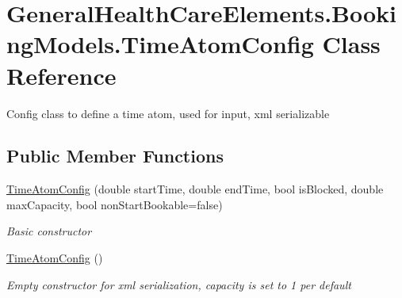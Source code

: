 \hypertarget{class_general_health_care_elements_1_1_booking_models_1_1_time_atom_config}{}\section{General\+Health\+Care\+Elements.\+Booking\+Models.\+Time\+Atom\+Config Class Reference}
\label{class_general_health_care_elements_1_1_booking_models_1_1_time_atom_config}


Config class to define a time atom, used for input, xml serializable  


\subsection*{Public Member Functions}
\begin{DoxyCompactItemize}
\item 
\hyperlink{class_general_health_care_elements_1_1_booking_models_1_1_time_atom_config_a556c797357ec793089715f9aaf97258c}{Time\+Atom\+Config} (double start\+Time, double end\+Time, bool is\+Blocked, double max\+Capacity, bool non\+Start\+Bookable=false)
\begin{DoxyCompactList}\small\item\em Basic constructor \end{DoxyCompactList}\item 
\hyperlink{class_general_health_care_elements_1_1_booking_models_1_1_time_atom_config_a3004a68eab9a805d4c3bbecf45eecd15}{Time\+Atom\+Config} ()
\begin{DoxyCompactList}\small\item\em Empty constructor for xml serialization, capacity is set to 1 per default \end{DoxyCompactList}\end{DoxyCompactItemize}
